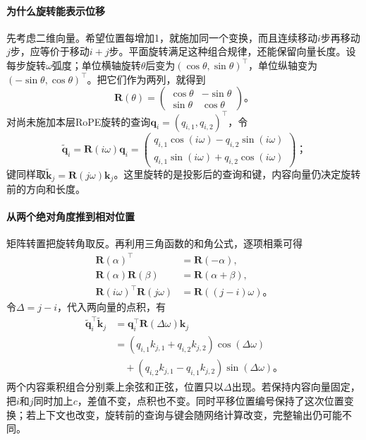 \paragraph{为什么旋转能表示位移}
先考虑二维向量。希望位置每增加1，就施加同一个变换，而且连续移动$i$步再移动$j$步，应等价于移动$i+j$步。平面旋转满足这种组合规律，还能保留向量长度。设每步旋转$\omega$弧度；单位横轴旋转$\theta$后变为$(\cos\theta,\sin\theta)^{\top}$，单位纵轴变为$(-\sin\theta,\cos\theta)^{\top}$。把它们作为两列，就得到
\begin{equation}
  \bm R(\theta)=
  \begin{pmatrix}
    \cos\theta&-\sin\theta\\
    \sin\theta&\cos\theta
  \end{pmatrix}\text{。}
  \label{eq:transformer-rope-rotation}
\end{equation}
对尚未施加本层RoPE旋转的查询$\bm q_i=(q_{i,1},q_{i,2})^{\top}$，令
\[
  \widetilde{\bm q}_i=\bm R(i\omega)\bm q_i
  =\begin{pmatrix}
     q_{i,1}\cos(i\omega)-q_{i,2}\sin(i\omega)\\
     q_{i,1}\sin(i\omega)+q_{i,2}\cos(i\omega)
   \end{pmatrix}\text{；}
\]
键同样取$\widetilde{\bm k}_j=\bm R(j\omega)\bm k_j$。这里旋转的是投影后的查询和键，内容向量仍决定旋转前的方向和长度。

\paragraph{从两个绝对角度推到相对位置}
矩阵转置把旋转角取反。再利用三角函数的和角公式，逐项相乘可得
\begin{equation}
  \begin{aligned}
    \bm R(\alpha)^{\top}&=\bm R(-\alpha),\\
    \bm R(\alpha)\bm R(\beta)&=\bm R(\alpha+\beta),\\
    \bm R(i\omega)^{\top}\bm R(j\omega)
      &=\bm R((j-i)\omega)\text{。}
  \end{aligned}
  \label{eq:transformer-rope-composition}
\end{equation}
令$\Delta=j-i$，代入两向量的点积，有
\begin{equation}
  \begin{aligned}
    \widetilde{\bm q}_i^{\top}\widetilde{\bm k}_j
      &=\bm q_i^{\top}\bm R(\Delta\omega)\bm k_j\\
      &=(q_{i,1}k_{j,1}+q_{i,2}k_{j,2})\cos(\Delta\omega)\\
      &\quad +(q_{i,2}k_{j,1}-q_{i,1}k_{j,2})\sin(\Delta\omega)\text{。}
  \end{aligned}
  \label{eq:transformer-rope-two-dimensional}
\end{equation}
两个内容乘积组合分别乘上余弦和正弦，位置只以$\Delta$出现。若保持内容向量固定，把$i$和$j$同时加上$c$，差值不变，点积也不变。同时平移位置编号保持了这次位置变换；若上下文也改变，旋转前的查询与键会随网络计算改变，完整输出仍可能不同。

